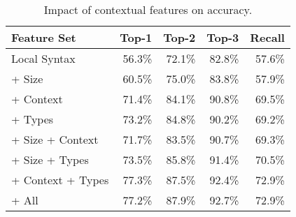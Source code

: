 \begin{table}[ht]
  \begin{minipage}{0.49\linewidth}
  \centering
  \hiddenFH
  \begin{tabular}{lrrrr}
    \toprule
    Feature Set                 & Top-1  & Top-2  & Top-3  & Recall \\
    \midrule
    Local Syntax                & 56.3\% & 72.1\% & 82.8\% & 57.6\% \\
    \midrule
    + Size                      & 60.5\% & 75.0\% & 83.8\% & 57.9\% \\
    + Context                   & 71.4\% & 84.1\% & 90.8\% & 69.5\% \\
    + Types                     & 73.2\% & 84.8\% & 90.2\% & 69.2\% \\
    \midrule
    + Size + Context            & 71.7\% & 83.5\% & 90.7\% & 69.3\% \\
    + Size + Types              & 73.5\% & 85.8\% & 91.4\% & 70.5\% \\
    + Context + Types           & 77.3\% & 87.5\% & 92.4\% & 72.9\% \\
    \midrule
    + All                       & 77.2\% & 87.9\% & 92.7\% & 72.9\% \\
    \bottomrule
  \end{tabular}
  \end{minipage}
  \caption{
    Impact of contextual features on accuracy.
  }\label{tab:type-error-slice}
\end{table}




